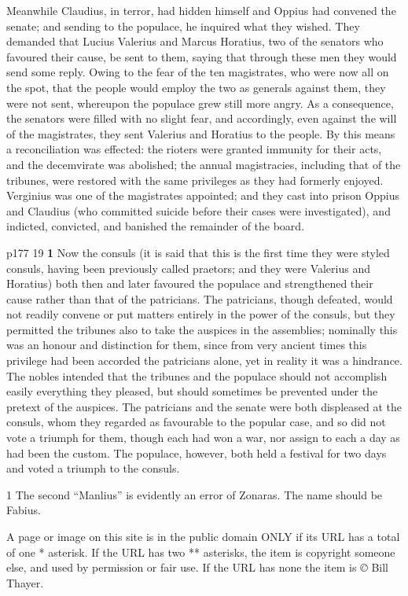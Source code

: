Meanwhile Claudius, in terror, had hidden himself and Oppius had convened the senate; and sending to the populace, he inquired what they wished. They demanded that Lucius Valerius and Marcus Horatius, two of the senators who favoured their cause, be sent to them, saying that through these men they would send some reply. Owing to the fear of the ten magistrates, who were now all on the spot, that the people would employ the two as generals against them, they were not sent, whereupon the populace grew still more angry. As a consequence, the senators were filled with no slight fear, and accordingly, even against the will of the magistrates, they sent Valerius and Horatius to the people. By this means a reconciliation was effected: the rioters were granted immunity for their acts, and the decemvirate was abolished; the annual magistracies, including that of the tribunes, were restored with the same privileges as they had formerly enjoyed. Verginius was one of the magistrates appointed; and they cast into prison Oppius and Claudius (who committed suicide before their cases were investigated), and indicted, convicted, and banished the remainder of the board.

p177
19
\textbf{1} Now the consuls (it is said that this is the first time they were styled consuls, having been previously called praetors; and they were Valerius and Horatius) both then and later favoured the populace and strengthened their cause rather than that of the patricians. The patricians, though defeated, would not readily convene or put matters entirely in the power of the consuls, but they permitted the tribunes also to take the auspices in the assemblies; nominally this was an honour and distinction for them, since from very ancient times this privilege had been accorded the patricians alone, yet in reality it was a hindrance. The nobles intended that the tribunes and the populace should not accomplish easily everything they pleased, but should sometimes be prevented under the pretext of the auspices. The patricians and the senate were both displeased at the consuls, whom they regarded as favourable to the popular case, and so did not vote a triumph for them, though each had won a war, nor assign to each a day as had been the custom. The populace, however, both held a festival for two days and voted a triumph to the consuls.

1
The second ``Manlius'' is evidently an error of Zonaras. The name should be Fabius.

A page or image on this site is in the public domain ONLY if its URL has a total of one * asterisk. If the URL has two ** asterisks, the item is copyright someone else, and used by permission or fair use. If the URL has none the item is \emph{©} Bill Thayer.

